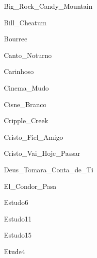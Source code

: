 \documentclass{scrartcl}
\begin{document}

{Big_Rock_Candy_Mountain}


{Bill_Cheatum}


{Bourree}


{Canto_Noturno}


{Carinhoso}


{Cinema_Mudo}


{Cisne_Branco}


{Cripple_Creek}


{Cristo_Fiel_Amigo}


{Cristo_Vai_Hoje_Passar}


{Deus_Tomara_Conta_de_Ti}


{El_Condor_Pasa}


{Estudo6}


{Estudo11}


{Estudo15}


{Etude4}
\end{document}
